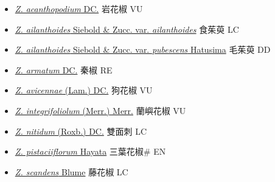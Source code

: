 \begin{itemize}
  \begin{itemize}
        \item[] \href{http://www.theplantlist.org/tpl1.1/search?q=Zanthoxylum+acanthopodium}{\textit{Z. acanthopodium} DC.}   岩花椒 VU
        \item[] \href{http://www.theplantlist.org/tpl1.1/search?q=Zanthoxylum+ailanthoides+var.+ailanthoides}{\textit{Z. ailanthoides} Siebold \& Zucc. var. \textit{ailanthoides}}   食茱萸 LC
        \item[] \href{http://www.theplantlist.org/tpl1.1/search?q=Zanthoxylum+ailanthoides+var.+pubescens}{\textit{Z. ailanthoides} Siebold \& Zucc. var. \textit{pubescens} Hatusima}   毛茱萸 DD
        \item[] \href{http://www.theplantlist.org/tpl1.1/search?q=Zanthoxylum+armatum}{\textit{Z. armatum} DC.}   秦椒 RE
        \item[] \href{http://www.theplantlist.org/tpl1.1/search?q=Zanthoxylum+avicennae}{\textit{Z. avicennae} (Lam.) DC.}   狗花椒 VU
        \item[] \href{http://www.theplantlist.org/tpl1.1/search?q=Zanthoxylum+integrifoliolum}{\textit{Z. integrifoliolum} (Merr.) Merr.}   蘭嶼花椒 VU
        \item[] \href{http://www.theplantlist.org/tpl1.1/search?q=Zanthoxylum+nitidum}{\textit{Z. nitidum} (Roxb.) DC.}   雙面刺 LC
        \item[] \href{http://www.theplantlist.org/tpl1.1/search?q=Zanthoxylum+pistaciiflorum}{\textit{Z. pistaciiflorum} Hayata}   三葉花椒\# EN
        \item[] \href{http://www.theplantlist.org/tpl1.1/search?q=Zanthoxylum+scandens}{\textit{Z. scandens} Blume}   藤花椒 LC

\end{itemize}
\end{itemize}
